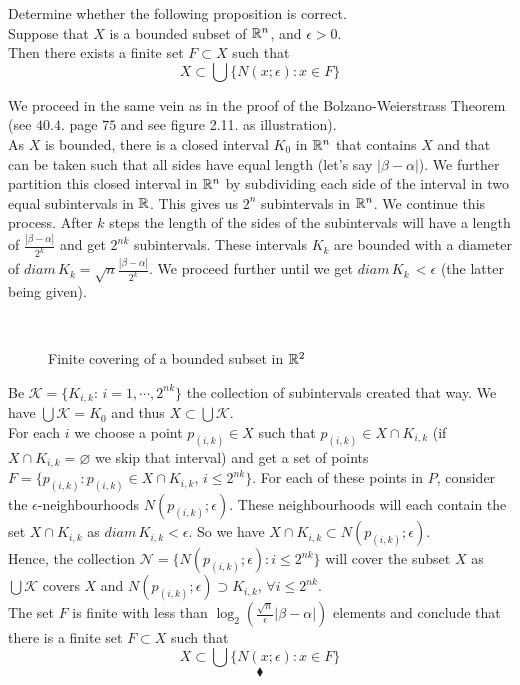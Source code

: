 \begin{tcolorbox}
Determine whether the following proposition is correct.\\
Suppose that $X$ is a bounded subset of $\mathbb{R}^n$, and $\epsilon>0$.\\
Then there exists a finite set $F\subset X$  such that
$$X\subset \bigcup\{ N(x;\epsilon):x\in F\}$$
\end{tcolorbox}
We proceed in the same vein as in the proof of the Bolzano-Weierstrass Theorem (see $\mathbf{40.4.}$ page $75$ and see figure 2.11. as illustration).  \\
As $X$ is bounded, there is a closed interval $K_0$ in $\mathbb{R}^n$ that contains $X$ and that can be taken such that all sides have equal length (let's say $|\beta-\alpha|$). We further partition this closed interval in $\mathbb{R}^n$ by subdividing each side of the interval in two equal subintervals in $\mathbb{R}$. This gives us $2^n$ subintervals in $\mathbb{R}^n$. We continue this process. After $k$ steps the length of the sides of the subintervals will have a length of $\frac{|\beta-\alpha|}{2^k}$ and get $2^{nk}$ subintervals. These intervals $K_k$ are bounded with a diameter of $diam\,  K_k = \sqrt{n}\frac{|\beta-\alpha|}{2^k}$. We proceed further until we get $diam \, K_k\, < \epsilon$ (the latter being given).
 \begin{figure}[H]%
    \centering
\\
\caption{Finite covering of a bounded subset in $\mathbb{R}^2$}
\label{fig:fig_p8a}
\end{figure}
Be $\mathscr{K}= \{K_{i,k}:\, i=1,\cdots, 2^{nk}\} $ the collection of  subintervals created that way. We have $\bigcup \mathscr{K}= K_0$ and thus $X\subset \bigcup \mathscr{K}$. \\ For each $i$ we choose a point $p_{(i,k)} \in X$ such that $p_{(i,k)}\in X\cap K_{i,k}$ (if $ X\cap K_{i,k}=\varnothing$ we skip that interval) and get a set of points $F= \{p_{(i,k)}: p_{(i,k)} \in X\cap K_{i,k},\, i\leq  2^{nk}\}$. For each of these points in $P$, consider the $\epsilon$-neighbourhoods $N(p_{(i,k)};\epsilon)$. These neighbourhoods will each contain the set $X\cap K_{i,k}$ as $diam\, K_{i,k}< \epsilon$. So we have $X\cap K_{i,k}\subset N(p_{(i,k)};\epsilon)$.\\
 Hence, the collection $\mathscr{N}=\{N(p_{(i,k)};\epsilon):  i\leq  2^{nk}\}$ will cover the subset $X$ as $\bigcup \mathscr{K}$ covers $X$ and $N(p_{(i,k)};\epsilon)\supset K_{i,k},\, \forall i \leq  2^{nk}$.\\
 The set $F$ is finite with less than $\log_2\left( \frac{\sqrt{n}}{\epsilon}|\beta-\alpha|\right)$ elements and conclude that there is a finite set $F\subset X$  such that
$$X\subset \bigcup\{ N(x;\epsilon):x\in F\}$$
$$\blacklozenge$$
